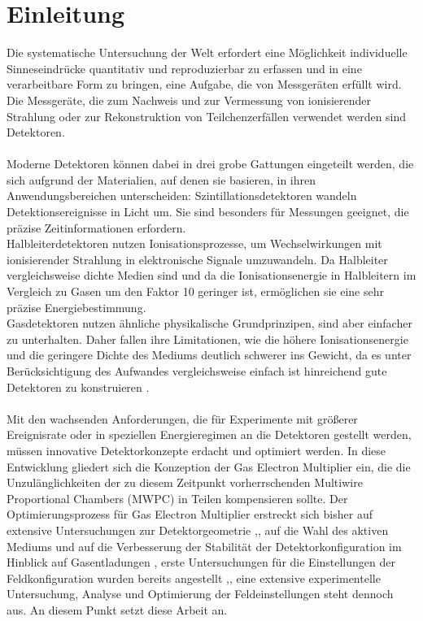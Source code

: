 \chapter{Einleitung}


\noindent Die systematische Untersuchung der Welt erfordert eine Möglichkeit individuelle Sinneseindrücke quantitativ und reproduzierbar zu erfassen und in eine verarbeitbare Form zu bringen, eine Aufgabe, die von Messgeräten erfüllt wird. Die Messgeräte, die zum Nachweis und zur Vermessung von ionisierender Strahlung oder zur Rekonstruktion von Teilchenzerfällen verwendet werden sind Detektoren.\\
\\
Moderne Detektoren können dabei in drei grobe Gattungen eingeteilt werden, die sich aufgrund der Materialien, auf denen sie basieren, in ihren Anwendungsbereichen unterscheiden: Szintillationsdetektoren wandeln Detektionsereignisse in Licht um. Sie sind besonders für Messungen geeignet, die präzise Zeitinformationen erfordern.\\
Halbleiterdetektoren nutzen Ionisationsprozesse, um Wechselwirkungen mit ionisierender Strahlung in elektronische Signale umzuwandeln. Da Halbleiter vergleichsweise dichte Medien sind und da die Ionisationsenergie in Halbleitern im Vergleich zu Gasen um den Faktor 10 geringer ist, ermöglichen sie eine sehr präzise Energiebestimmung.\\
Gasdetektoren nutzen ähnliche physikalische Grundprinzipen, sind aber einfacher zu unterhalten. Daher fallen ihre Limitationen, wie die höhere Ionisationsenergie und die geringere Dichte des Mediums deutlich schwerer ins Gewicht, da es unter Berücksichtigung des Aufwandes vergleichsweise einfach ist hinreichend gute Detektoren zu konstruieren \cite{Leo}.\\
\\
Mit den wachsenden Anforderungen, die für Experimente mit größerer Ereignisrate oder in speziellen Energieregimen an die Detektoren gestellt werden, müssen innovative Detektorkonzepte erdacht und optimiert werden. In diese Entwicklung gliedert sich die Konzeption der Gas Electron Multiplier ein, die die Unzulänglichkeiten der zu diesem Zeitpunkt vorherrschenden Multiwire Proportional Chambers (MWPC) \cite{Sauli_Multiwire} \cite{GEM_Introduction} in Teilen kompensieren sollte. Der Optimierungsprozess für Gas Electron Multiplier erstreckt sich bisher auf extensive Untersuchungen zur Detektorgeometrie \cite{BUTTNER},\cite{Bachmann}, auf die Wahl des aktiven Mediums \cite{GAS_MIX} und auf die Verbesserung der Stabilität der Detektorkonfiguration im Hinblick auf Gasentladungen \cite{Stabilitaet_Discharge}, erste Untersuchungen für die Einstellungen  der Feldkonfiguration wurden bereits angestellt \cite{Bachmann},\cite{ottnad}, eine extensive experimentelle Untersuchung, Analyse und Optimierung der Feldeinstellungen steht dennoch aus. An diesem Punkt setzt diese Arbeit an.\\
